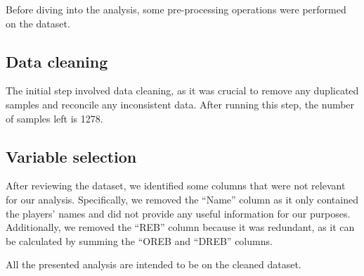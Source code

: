 Before diving into the analysis, some pre-processing operations were performed on the dataset.

\subsection{Data cleaning}
The initial step involved data cleaning, as it was crucial to remove any duplicated samples and reconcile any inconsistent data.
After running this step, the number of samples left is 1278.

\subsection{Variable selection}
After reviewing the dataset, we identified some columns that were not relevant for our analysis. Specifically, we removed the ``Name'' column as it only contained the players' names and did not provide any useful information for our purposes. Additionally, we removed the ``REB'' column because it was redundant, as it can be calculated by summing the ``OREB and ``DREB'' columns.

\noindent
All the presented analysis are intended to be on the cleaned dataset.